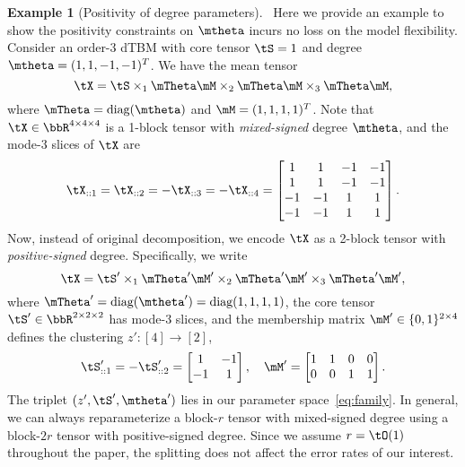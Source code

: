 \documentclass[lettersize,onecolumn,journal]{IEEEtran}
\theoremstyle{definition}
\theoremstyle{definition}
\newtheorem{example}{Example}
\begin{document}
\begin{example}[Positivity of degree parameters]~\label{ex:positive}
Here we provide an example to show the positivity constraints on $\mtheta$ incurs no loss on the model flexibility. 
Consider an order-3 dTBM with core tensor $\tS = 1$ and degree $\mtheta = (1,1,-1, -1)^T$. We have the mean tensor 
\begin{equation}
    \tX = \tS \times_1 \mTheta \mM \times_2 \mTheta \mM \times_3 \mTheta \mM,
\end{equation}
where $\mTheta = \text{diag}(\mtheta)$ and $\mM = (1,1,1,1)^T$. Note that $\tX \in \bbR^{4 \times 4 \times 4}$ is a 1-block tensor with \emph{mixed-signed} degree $\mtheta$, and the mode-3 slices of $\tX$ are
\begin{equation}
    \tX_{::1} = \tX_{::2} = - \tX_{::3} = -\tX_{::4}  = \begin{bmatrix}
    1 & 1& -1& -1 \\
    1 & 1& -1& -1 \\
    -1& -1&1 & 1\\
     -1& -1&1 & 1
    \end{bmatrix}.
\end{equation}
Now, instead of original decomposition, we encode $\tX$ as a 2-block tensor with \emph{positive-signed} degree. Specifically, we write
\begin{equation}
     \tX = \tS' \times_1 \mTheta' \mM' \times_2 \mTheta' \mM'  \times_3 \mTheta' \mM' , 
\end{equation}
where $\mTheta' = \text{diag}(\mtheta') = \text{diag}(1,1, 1, 1)$, the core tensor $\tS' \in \bbR^{2 \times 2 \times 2}$ has mode-3 slices, and the membership matrix $\mM'\in\{0,1\}^{2\times 4}$ defines the clustering $z'\colon[4]\to[2]$,
\begin{equation}
    \tS'_{::1} = -\tS'_{::2} = \begin{bmatrix}
    1 & -1 \\
    -1 & 1
    \end{bmatrix}, \quad \mM' = \begin{bmatrix}
   1& 1 & 0 & 0\\
    0 &0 &  1& 1 
    \end{bmatrix}.
\end{equation}
 The triplet $(z',\tS', \mtheta')$ lies in our parameter space~\eqref{eq:family}. In general, we can always reparameterize a block-$r$ tensor with mixed-signed degree using a block-$2r$ tensor with positive-signed degree. Since we assume $r=\tO(1)$ throughout the paper, the splitting does not affect the error rates of our interest.\end{example}
\end{document}
